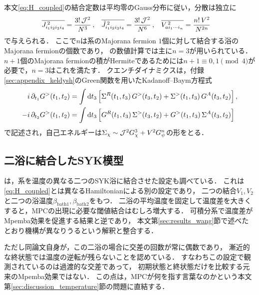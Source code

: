 \documentclass[a4paper,11pt,onecolumn,baselineskip=14.5pt]{jlreq}
\begin{document}
本文\eqref{eq:H_coupled}の結合定数は平均零のGauss分布に従い，分散は独立に
\begin{align}
  \overline{J_{i_1 i_2 i_3 i_4}^{\,2}} &= \frac{3!\,\mathcal{J}^2}{N^3}\,, &
  \overline{\tilde{J}_{i_1 i_2 i_3 i_4}^{\,2}} &= \frac{3!\,\mathcal{J}^2}{N^6}\,, &
  \overline{V_{a i_1 \cdots i_n}^{\,2}} &= \frac{n!\,V^2}{N^{2n}}
  \label{eq:variances}
\end{align}
で与えられる\cite{Wang2024}．
ここで$n$は系のMajorana fermion $1$個に対して結合する浴のMajorana fermionの個数であり，
\cite{Wang2024}の数値計算では主に$n=3$が用いられている．
$n+1$個のMajorana fermionの積がHermiteであるためには$n+1\equiv0,1\pmod 4$が必要で，$n=3$はこれを満たす．
クエンチダイナミクスは，付録\ref{sec:appendix_keldysh}のGreen関数を用いたKadanoff--Baym方程式
\begin{equation}
  \begin{split}
    i\,\partial_{t_1}G^{>}(t_1,t_2)
      &= \int \dd{t_3}\Big[\Sigma^{R}(t_1,t_3)\,G^{>}(t_3,t_2)
        + \Sigma^{>}(t_1,t_3)\,G^{A}(t_3,t_2)\Big]\,,\\
    -i\,\partial_{t_2}G^{>}(t_1,t_2)
      &= \int \dd{t_3}\Big[G^{R}(t_1,t_3)\,\Sigma^{>}(t_3,t_2)
        + G^{>}(t_1,t_3)\,\Sigma^{A}(t_3,t_2)\Big]
  \end{split}
  \label{eq:kadanoff_baym}
\end{equation}
で記述され，自己エネルギーは$\Sigma_\chi\sim\mathcal{J}^2 G_\chi^3+V^2 G_\psi^n$の形をとる\cite{Wang2024}．

\subsection{二浴に結合したSYK模型}
\label{sec:appendix_twobath}

\cite{Wang2024}は，系を温度の異なる二つのSYK浴に結合させた設定も調べている．
これは\eqref{eq:H_coupled}とは異なるHamiltonianによる別の設定であり，
二つの結合$V_1,V_2$と二つの浴温度$\beta_{\mathrm{bath}1},\beta_{\mathrm{bath}2}$をもつ．
二浴の平均温度を固定して温度差を大きくすると，MPCの出現に必要な閾値結合はむしろ増大する．
可積分系で温度差がMpemba効果を促進する結果\cite{WangWang2024}と逆であり，
本文第\ref{sec:results_wang}節で述べたとおり機構が異なりうるという解釈と整合する．

ただし同論文自身が，この二浴の場合に交差の回数が常に偶数であり，
漸近的な終状態では温度の逆転が残らないことを認めている．
すなわちこの設定で観測されているのは過渡的な交差であって，
初期状態と終状態だけを比較する元来のMpemba効果ではない．
この点は，MPCが何を指す言葉なのかという本文第\ref{sec:discussion_temperature}節の問題に直結する．
\end{document}
